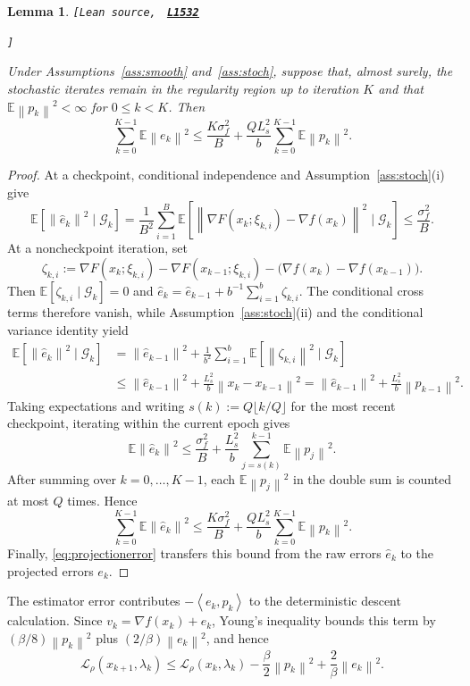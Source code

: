 \documentclass[11pt]{article}
\newtheorem{lemma}[theorem]{Lemma}
\theoremstyle{definition}
\theoremstyle{remark}
\numberwithin{equation}{section}
\numberwithin{figure}{section}
\numberwithin{table}{section}
\numberwithin{algorithm}{section}
\newcommand{\E}{\mathbb{E}}
\newcommand{\cL}{\mathcal{L}}
\newcommand{\norm}[1]{\left\lVert #1\right\rVert}
\newcommand{\ip}[2]{\left\langle #1,#2\right\rangle}
\newcommand{\grad}{\nabla}
\newcommand{\leanLinkText}[1]{%
  \underline{\textbf{#1}}%
}
\newcommand{\leanDeclTag}[2]{%
  {\footnotesize\texttt{[Lean source, }}%
  \href{https://github.com/optpku/ReasBook/blob/v4.32.2/ReasBook/Papers/TR_LALM_theory/#1?plain=1\#L#2}%
    {\leanLinkText{\footnotesize\texttt{L#2}}}%
}
\newcommand{\leanDeclTagEnd}{%
  \unskip
  {\footnotesize\texttt{]}}\enspace
}
\begin{document}
\begin{lemma}
\label{lem:spider}
\leanDeclTag{Lemma_3_3.lean}{1532}
\leanDeclTagEnd
Under Assumptions~\ref{ass:smooth} and~\ref{ass:stoch}, suppose that, almost surely, the stochastic iterates remain in the regularity region up to iteration $K$ and that
\(\E\norm{p_k}^2<\infty\) for \(0\le k<K\). Then
\begin{equation}
    \sum_{k=0}^{K-1}\E\norm{e_k}^2
    \le \frac{K\sigma_f^2}{B}
       +\frac{QL_s^2}{b}
        \sum_{k=0}^{K-1}\E\norm{p_k}^2.
    \label{eq:spidersum}
\end{equation}
\end{lemma}

\begin{proof}
At a checkpoint, conditional independence and
Assumption~\ref{ass:stoch}\textup{(i)} give
$$
\E[\norm{\widehat e_k}^2\mid\mathcal G_k]
=\frac{1}{B^2}\sum_{i=1}^B
  \E[\norm{\grad F(x_k;\xi_{k,i})-\grad f(x_k)}^2\mid\mathcal G_k]
\le\frac{\sigma_f^2}{B}.
$$
At a noncheckpoint iteration, set
$$
\zeta_{k,i}:=\grad F(x_k;\xi_{k,i})-\grad F(x_{k-1};\xi_{k,i})
-\big(\grad f(x_k)-\grad f(x_{k-1})\big).
$$
Then \(\E[\zeta_{k,i}\mid\mathcal G_k]=0\) and
\(\widehat e_k=\widehat e_{k-1}+b^{-1}\sum_{i=1}^b\zeta_{k,i}\).
The conditional cross terms therefore vanish, while
Assumption~\ref{ass:stoch}\textup{(ii)} and the conditional variance identity yield
\begin{align*}
\E[\norm{\widehat e_k}^2\mid\mathcal G_k]
&=\norm{\widehat e_{k-1}}^2
  +\frac{1}{b^2}\sum_{i=1}^b
    \E[\norm{\zeta_{k,i}}^2\mid\mathcal G_k]\\
&\le\norm{\widehat e_{k-1}}^2
  +\frac{L_s^2}{b}\norm{x_k-x_{k-1}}^2
=\norm{\widehat e_{k-1}}^2
  +\frac{L_s^2}{b}\norm{p_{k-1}}^2.
\end{align*}
Taking expectations and writing
\(s(k):=Q\lfloor k/Q\rfloor\) for the most recent checkpoint, iterating
within the current epoch gives
$$
\E\norm{\widehat e_k}^2
\le \frac{\sigma_f^2}{B}
  +\frac{L_s^2}{b}\sum_{j=s(k)}^{k-1}\E\norm{p_j}^2.
$$
After summing over \(k=0,\ldots,K-1\), each \(\E\norm{p_j}^2\) in the
double sum is counted at most \(Q\) times.  Hence
$$
\sum_{k=0}^{K-1}\E\norm{\widehat e_k}^2
\le \frac{K\sigma_f^2}{B}
  +\frac{QL_s^2}{b}\sum_{k=0}^{K-1}\E\norm{p_k}^2.
$$
Finally, \eqref{eq:projectionerror} transfers this bound from the raw errors
\(\widehat e_k\) to the projected errors \(e_k\).
\end{proof}

The estimator error contributes \(-\ip{e_k}{p_k}\) to the deterministic
descent calculation.  Since \(v_k=\grad f(x_k)+e_k\), Young's inequality
bounds this term by \((\beta/8)\norm{p_k}^2\) plus
\((2/\beta)\norm{e_k}^2\), and hence
$$
    \cL_\rho(x_{k+1},\lambda_k)
    \le\cL_\rho(x_k,\lambda_k)
       -\frac{\beta}{2}\norm{p_k}^2
       +\frac{2}{\beta}\norm{e_k}^2.
$$
\end{document}
